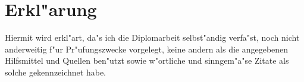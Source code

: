 \newpage

\section*{Erkl"arung}

\vspace{25mm}

Hiermit wird erkl"art, da"s ich die Diplomarbeit selbst"andig verfa"st, noch nicht anderweitig f"ur Pr"ufungszwecke vorgelegt, keine andern als die angegebenen Hilfsmittel und Quellen ben"utzt sowie w"ortliche und sinngem"a"se Zitate als solche gekennzeichnet habe.

\vspace{35mm}
